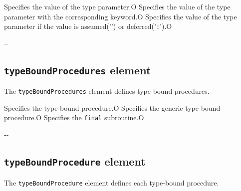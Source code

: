 \begin{XcodeMLChildElements}
{Specifies the value of the type parameter.}{O}
{Specifies the value of the type parameter with the corresponding keyword.}{O}
{Specifies the value of the type parameter if the value is assumed('{\tt *}') or deferred('{\tt :}').}{O}
\end{XcodeMLChildElements}

\begin{XcodeMLAttributes}
\XcodeMLAttrDef{-}{-}
{-}{-}
\end{XcodeMLAttributes}


\subsection{ {\tt typeBoundProcedures} element}

The {\tt typeBoundProcedures} element defines type-bound procedures.


\begin{XcodeMLChildElements}
{Specifies the type-bound procedure.}{O}
{Specifies the generic type-bound procedure.}{O}
{Specifies the {\tt final} subroutine.}{O}
\end{XcodeMLChildElements}

\begin{XcodeMLAttributes}
\XcodeMLAttrDef{-}{-}
{-}{-}
\end{XcodeMLAttributes}


\subsection{ {\tt typeBoundProcedure} element}

The {\tt typeBoundProcedure} element defines each type-bound procedure.


